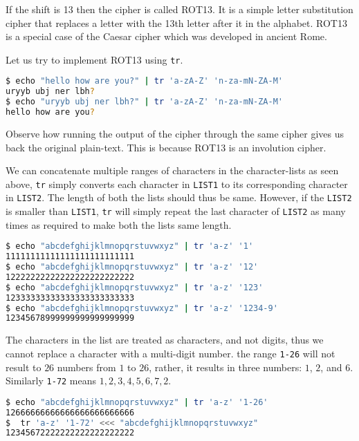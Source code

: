 If the shift is 13
then the cipher is called ROT13. It is a simple letter substitution cipher that replaces a letter with the 13th letter after it in the alphabet. ROT13 is a special case of the Caesar cipher which was developed in ancient Rome.

Let us try to implement ROT13 using \lstinline|tr|.

\begin{lstlisting}[language=bash]
$ echo "hello how are you?" | tr 'a-zA-Z' 'n-za-mN-ZA-M'
uryyb ubj ner lbh?
$ echo "uryyb ubj ner lbh?" | tr 'a-zA-Z' 'n-za-mN-ZA-M'
hello how are you?
\end{lstlisting}

Observe how running the output of the cipher through the same cipher gives us back the original plain-text. This is because ROT13 is an involution cipher.

We can concatenate multiple ranges of characters in the character-lists as seen above, \lstinline|tr| simply converts each character in \lstinline|LIST1| to its corresponding character in \lstinline|LIST2|. The length of both the lists should thus be same. However, if the \lstinline|LIST2| is smaller than \lstinline|LIST1|, \lstinline|tr| will simply repeat the last character of \lstinline|LIST2| as many times as required to make both the lists same length.

\begin{lstlisting}[language=bash]
$ echo "abcdefghijklmnopqrstuvwxyz" | tr 'a-z' '1'
11111111111111111111111111
$ echo "abcdefghijklmnopqrstuvwxyz" | tr 'a-z' '12'
12222222222222222222222222
$ echo "abcdefghijklmnopqrstuvwxyz" | tr 'a-z' '123'
12333333333333333333333333
$ echo "abcdefghijklmnopqrstuvwxyz" | tr 'a-z' '1234-9'
12345678999999999999999999
\end{lstlisting}

The characters in the list are treated as characters, and not digits, thus we cannot replace a character with a multi-digit number. the range \lstinline|1-26| will not result to $26$ numbers from $1$ to $26$, rather, it results in three numbers: $1$, $2$, and $6$. Similarly \lstinline|1-72| means $1,2,3,4,5,6,7,2$.

\begin{lstlisting}[language=bash]
$ echo "abcdefghijklmnopqrstuvwxyz" | tr 'a-z' '1-26'
12666666666666666666666666
$  tr 'a-z' '1-72' <<< "abcdefghijklmnopqrstuvwxyz"
12345672222222222222222222
\end{lstlisting}

